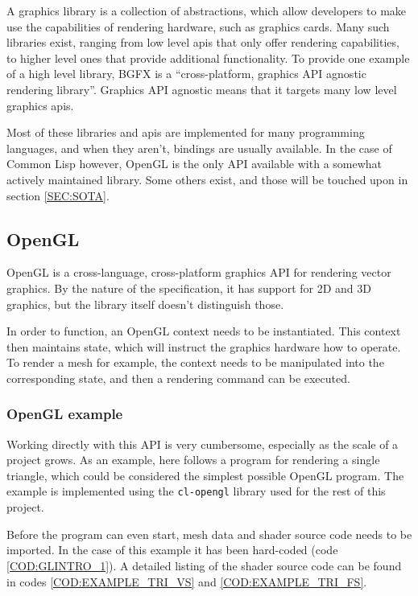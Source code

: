 
A graphics library is a collection of abstractions,
which allow developers to make use the capabilities of rendering hardware,
such as graphics cards.
Many such libraries exist,
ranging from low level \ac{api}s that only offer rendering capabilities,
to higher level ones that provide additional functionality.
To provide one example of a high level library,
BGFX\cite{bgfx} is a ``cross-platform, graphics API agnostic rendering library''.
Graphics API agnostic means that it targets many low level graphics \ac{api}s.

Most of these libraries and \ac{api}s are implemented for many programming languages,
and when they aren't,
bindings are usually available.
In the case of Common Lisp however,
OpenGL is the only API available with a somewhat actively maintained library.
Some others exist,
and those will be touched upon in section \ref{SEC:SOTA}.

\subsection{OpenGL}


OpenGL\cite{khronos} is a cross-language,
cross-platform graphics API for rendering vector graphics.
By the nature of the specification,
it has support for 2D and 3D graphics,
but the library itself doesn't distinguish those.

In order to function,
an OpenGL context needs to be instantiated.
This context then maintains state,
which will instruct the graphics hardware how to operate.
To render a mesh for example,
the context needs to be manipulated into the corresponding state,
and then a rendering command can be executed.

\subsubsection{OpenGL example}

Working directly with this API is very cumbersome,
especially as the scale of a project grows.
As an example,
here follows a program for rendering a single triangle,
which could be considered the simplest possible OpenGL program.
The example is implemented using the \texttt{cl-opengl}\cite{clopengl} library used for the rest of this project.

Before the program can even start,
mesh data and shader source code needs to be imported.
In the case of this example it has been hard-coded (code \ref{COD:GLINTRO_1}).
A detailed listing of the shader source code can be found in codes \ref{COD:EXAMPLE_TRI_VS} and \ref{COD:EXAMPLE_TRI_FS}.

